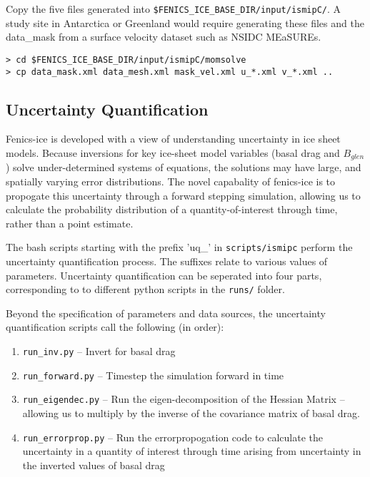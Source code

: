 \documentclass[11pt, reqno, nocenter]{article}
\begin{document}
Copy the five files generated into {\tt \$FENICS\_ICE\_BASE\_DIR/input/ismipC/}. A study site in Antarctica or Greenland would require generating these files and the data\_mask from a surface velocity dataset such as NSIDC MEaSUREs.

\begin{verbatim}
> cd $FENICS_ICE_BASE_DIR/input/ismipC/momsolve
> cp data_mask.xml data_mesh.xml mask_vel.xml u_*.xml v_*.xml ..
\end{verbatim}

\subsection{Uncertainty Quantification}

Fenics-ice is developed with a view of understanding uncertainty in ice sheet models. Because inversions for key ice-sheet model variables (basal drag and $B_{glen}$) solve under-determined systems of equations, the solutions may have large, and spatially varying error distributions. The novel capabality of fenics-ice is to propogate this uncertainty through a forward stepping simulation, allowing us to calculate the probability distribution of a quantity-of-interest through time, rather than a point estimate. 

The bash scripts starting with the prefix 'uq\_' in {\tt scripts/ismipc} perform the uncertainty quantification process. The suffixes relate to various values of parameters. Uncertainty quantification can be seperated into four parts, corresponding to to different python scripts in the {\tt runs/} folder.

Beyond the specification of parameters and data sources, the uncertainty quantification scripts call the following (in order):

\begin{enumerate}
	\item {\tt run\_inv.py} -- Invert for basal drag
	\item {\tt run\_forward.py} -- Timestep the simulation forward in time
	\item {\tt run\_eigendec.py} -- Run the eigen-decomposition of the Hessian Matrix -- allowing us to multiply by the inverse of the covariance matrix of basal drag.
	\item {\tt run\_errorprop.py} -- Run the errorpropogation code to calculate the uncertainty in a quantity of interest through time arising from uncertainty in the inverted values of basal drag
\end{enumerate}
\end{document}
